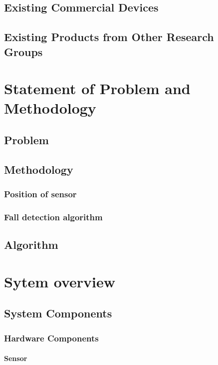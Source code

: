 \documentclass[letterpaper,12pt,titlepage,oneside,final]{book}
\begin{document}
\section{Existing Commercial Devices}

\section{Existing Products from Other Research Groups}


\chapter{Statement of Problem and Methodology}

\section{Problem}

\section{Methodology}

\subsection{Position of sensor}

\subsection{Fall detection algorithm}

\section{Algorithm}

\chapter{Sytem overview}

\section{System Components}

\subsection{Hardware Components}

\subsubsection{Sensor}
\end{document}
